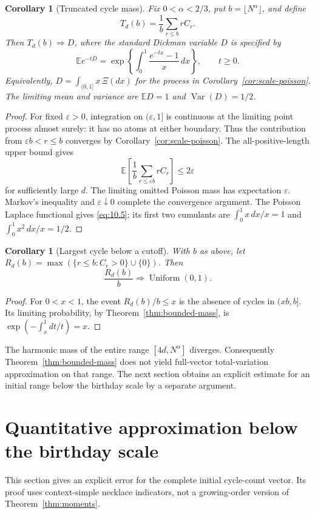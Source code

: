 \documentclass[11pt]{article}
\newtheorem{corollary}[theorem]{Corollary}
\theoremstyle{remark}
\begin{document}
\begin{corollary}[Truncated cycle mass]\label{cor:dickman}
Fix $0<\alpha<2/3$, put $b=\lfloor N^\alpha\rfloor$, and define
\[
 T_d(b)=\frac1b\sum_{r\le b}rC_r.
\]
Then $T_d(b)\Longrightarrow D$, where the standard Dickman variable $D$ is
specified by
\[
 \mathbb E e^{-tD}
 =\exp\!\left\{\int_0^1\frac{e^{-tx}-1}{x}\,dx\right\},
 \qquad t\ge0.
 \tag{10.5}\label{eq:10.5}
\]
Equivalently, $D=\int_{(0,1]}x\,\Xi(dx)$ for the process in
Corollary~\ref{cor:scale-poisson}. The limiting mean and variance are
$\mathbb ED=1$ and $\operatorname{Var}(D)=1/2$.
\end{corollary}
\begin{proof}
For fixed $\varepsilon>0$, integration on $(\varepsilon,1]$ is continuous
at the limiting point process almost surely: it has no atoms at either
boundary. Thus the contribution from $\varepsilon b<r\le b$ converges by
Corollary~\ref{cor:scale-poisson}. The all-positive-length upper bound gives
\[
 \mathbb E\left[\frac1b\sum_{r\le\varepsilon b}rC_r\right]
 \le2\varepsilon
\]
for sufficiently large $d$. The limiting omitted Poisson mass has expectation
$\varepsilon$. Markov's inequality and $\varepsilon\downarrow0$ complete the
convergence argument. The Poisson Laplace functional gives
\eqref{eq:10.5}; its first two cumulants are
$\int_0^1x\,dx/x=1$ and $\int_0^1x^2\,dx/x=1/2$.
\end{proof}

\begin{corollary}[Largest cycle below a cutoff]\label{cor:maximum}
With $b$ as above, let
$R_d(b)=\max(\{r\le b:C_r>0\}\cup\{0\})$. Then
\[
 \frac{R_d(b)}b\Longrightarrow\operatorname{Uniform}(0,1).
 \tag{10.6}\label{eq:10.6}
\]
\end{corollary}
\begin{proof}
For $0<x<1$, the event $R_d(b)/b\le x$ is the absence of cycles in
$(xb,b]$. Its limiting probability, by Theorem~\ref{thm:bounded-mass}, is
$\exp(-\int_x^1dt/t)=x$.
\end{proof}

The harmonic mass of the entire range $[4d,N^\alpha]$ diverges. Consequently
Theorem~\ref{thm:bounded-mass} does not yield full-vector total-variation
approximation on that range. The next section obtains an explicit estimate
for an initial range below the birthday scale by a separate argument.

\section{Quantitative approximation below the birthday scale}\label{sec:birthday}
This section gives an explicit error for the complete initial cycle-count
vector. Its proof uses context-simple necklace indicators, not a growing-order
version of Theorem~\ref{thm:moments}.
\end{document}

